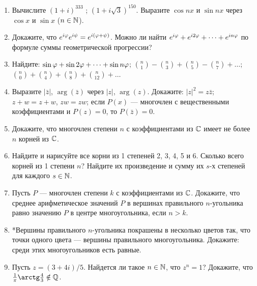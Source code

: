 \begin{enumerate}
\item  Вычислите \ipunkt  $(1 + i)^{333}$ ; \ipunkt  $(1 + i\sqrt 3)^{150}$. \ipunkt  Выразите $\cos nx$ и $\sin nx$ через $\cos x$ и $\sin x$ ($n \in\mathbb N$).
\item  \ipunkt  Докажите, что $e^{i\varphi} e^{i\psi} = e^{i(\varphi+\psi)}$.
\ipunkt  Можно ли найти $e^{i\varphi} + e^{i2\varphi} + \dots + e^{in\varphi}$ по формуле суммы геометрической прогрессии?
\item  Найдите: \ipunkt  $\sin \varphi + \sin 2\varphi + \dots + \sin n\varphi$; \ipunkt  $\binom n 1 - \binom n 3 + \binom n 5 - \binom n 7 + \dots$; \ipunkt  $\binom n 0 + \binom n 4 + \binom n 8 + \binom n {12} + \dots$
\item  \ipunkt  Выразите $|\bar z|$, $\arg (\bar z)$ через $|z|$, $\arg (z)$. Докажите: \ipunkt  $|z|^2 = z\bar z$; \ipunkt  $z + w = z + w$, $zw = z w$;
\ipunkt  если $P (x)$ — многочлен с вещественными коэффициентами и $P (z) = 0$, то $P (\bar z) = 0$.
\item  Докажите, что многочлен степени $n$ с коэффициентами из $\mathbb C$ имеет не более $n$ корней из $\mathbb C$.
\item  \ipunkt  Найдите и нарисуйте все корни из 1 степеней 2, 3, 4, 5 и 6. \ipunkt  Сколько всего корней из 1
степени $n$? Найдите их произведение и сумму их $s$-х степеней для каждого $s \in \mathbb N$.
\item  Пусть $P$ — многочлен степени $k$ с коэффициентами из $\mathbb C$. Докажите, что среднее арифметическое
значений $P$ в вершинах правильного $n$-угольника равно значению $P$ в центре многоугольника, если $n > k$.
\item  *Вершины правильного $n$-угольника покрашены в несколько цветов так, что точки одного цвета —
вершины правильного многоугольника. Докажите: среди этих многоугольников есть равные.
\item 
 \ipunkt  Пусть $z = (3 + 4i)/5$. Найдется ли такое $n \in \mathbb N$, что $z^n = 1$? \ipunkt  Докажите, что
 $\frac{1}{\pi}\arctg \frac43 \notin \Q$.

\end{enumerate}

